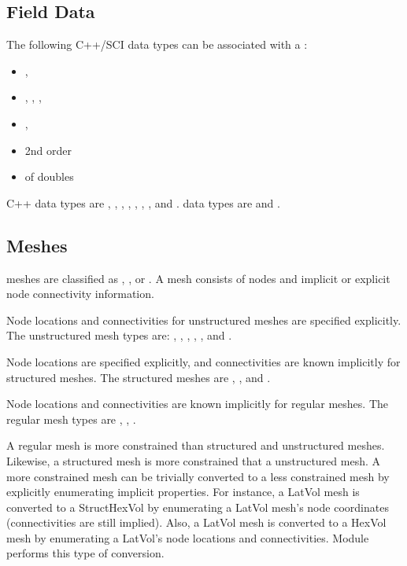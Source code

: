 \subsection{Field Data}

The following C++/SCI data types can be associated with a :

\begin{itemize}
\item {}, 
\item {}, , , 
\item {}, 
\item 2nd order 
\item {} of doubles
\end{itemize}

C++ data types are , ,
, , ,
, , and .  \sr{} data types are  and .

\subsection{Meshes}

\sr{} meshes are classified as , ,
or .  A mesh consists of nodes and implicit or explicit
node connectivity information.

Node locations and connectivities for unstructured 
meshes are specified
explicitly.  The unstructured mesh types are:
, ,
, ,
, and .

Node locations are specified explicitly, and connectivities are known
implicitly for structured meshes.  The 
structured meshes are
, , and
.

Node locations and connectivities are known implicitly for regular
meshes.  The regular mesh types 
are ,
, .

A regular mesh is more constrained than structured and unstructured
meshes.  Likewise, a structured mesh is more constrained that a
unstructured mesh.  A more constrained mesh can be trivially converted
to a less constrained mesh by explicitly enumerating implicit
properties.  For instance, a LatVol mesh is converted to a StructHexVol
by enumerating a LatVol mesh's node coordinates (connectivities are
still implied).  Also, a LatVol mesh is converted to a HexVol mesh by
enumerating a LatVol's node locations and connectivities.  Module
 performs this type of conversion.

